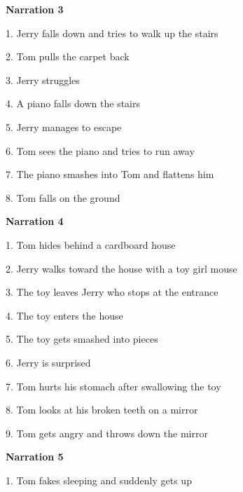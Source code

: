 \begin{appendix}
\textbf{Narration 3} \vspace{-0.3cm}

1. Jerry falls down and tries to walk up the stairs \vspace{-0.3cm}

2. Tom pulls the carpet back \vspace{-0.3cm}

3. Jerry struggles \vspace{-0.3cm}

4. A piano falls down the stairs \vspace{-0.3cm}

5. Jerry manages to escape \vspace{-0.3cm}

6. Tom sees the piano and tries to run away \vspace{-0.3cm}

7. The piano smashes into Tom and flattens him \vspace{-0.3cm}

8. Tom falls on the ground

\textbf{Narration 4} \vspace{-0.3cm}

1. Tom hides behind a cardboard house \vspace{-0.3cm}

2. Jerry walks toward the house with a toy girl mouse \vspace{-0.3cm}

3. The toy leaves Jerry who stops at the entrance \vspace{-0.3cm}

4. The toy enters the house \vspace{-0.3cm}

5. The toy gets smashed into pieces \vspace{-0.3cm}

6. Jerry is surprised \vspace{-0.3cm}

7. Tom hurts his stomach after swallowing the toy \vspace{-0.3cm}

8. Tom looks at his broken teeth on a mirror \vspace{-0.3cm}

9. Tom gets angry and throws down the mirror

\textbf{Narration 5} \vspace{-0.3cm}

1. Tom fakes sleeping and suddenly gets up \vspace{-0.3cm}


\end{appendix}

